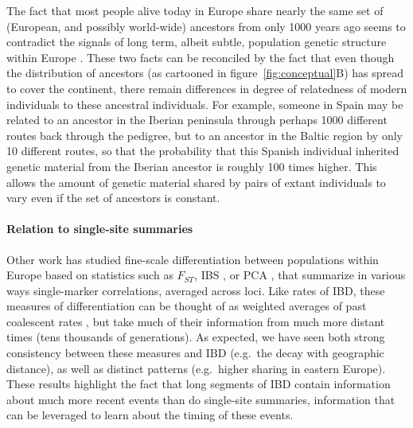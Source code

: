 \documentclass{article}
\begin{document}
The fact that most people alive today in Europe share nearly the same set of
(European, and possibly world-wide) ancestors from only 1000 years ago
seems to contradict the signals of long term, albeit subtle, population genetic structure within Europe
\citep[e.g.][]{novembre2008europe,lao2008correlation}. 
These two facts can be reconciled by the fact that even though the distribution of ancestors
(as cartooned in figure~\ref{fig:conceptual}B) 
has spread to cover the continent, 
there remain differences in degree of relatedness of modern individuals to these ancestral individuals.
For example, someone in Spain may be related to an ancestor in the Iberian peninsula 
through perhaps 1000 different routes back through the pedigree, 
but to an ancestor in the Baltic region by only 10 different routes, 
so that the probability that this Spanish individual inherited genetic material from the Iberian ancestor is roughly 100 times higher. 
This allows the amount of genetic material shared by pairs of extant individuals to vary
even if the set of ancestors is constant.

\paragraph{Relation to single-site summaries} 
Other work has studied fine-scale differentiation between populations within Europe
based on statistics such as $F_{ST}$, IBS \citep[e.g.][]{lao2008correlation,odushlaine2010population}, or PCA \citep{novembre2008europe},
that summarize in various ways single-marker correlations, averaged across loci.
Like rates of IBD, these measures of differentiation can be thought of as weighted averages of past coalescent rates 
\citep{malecot1970mathematics,slatkin1991inbreeding,rousset2002inbreeding,mcvean2009pca},
but take much of their information from much more distant times (tens thousands of generations).
As expected, we have seen both strong consistency between these measures and IBD (e.g.\ the decay with geographic distance),
as well as distinct patterns (e.g.\ higher sharing in eastern Europe).
These results highlight the fact that long segments of IBD contain information about much more recent events than do single-site summaries,
information that can be leveraged to learn about the timing of these events.
\end{document}
